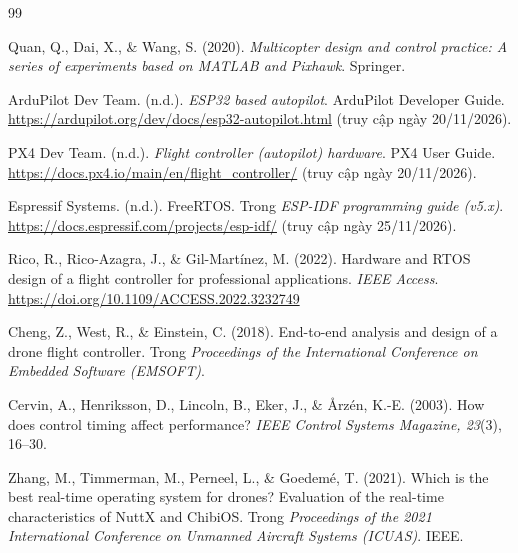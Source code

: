 
\begin{thebibliography}{99}
\footnotesize
\setlength{\itemsep}{0pt}
\setlength{\parskip}{0pt}

Quan, Q., Dai, X., \& Wang, S. (2020). \textit{Multicopter design and control practice: A series of experiments based on MATLAB and Pixhawk}. Springer.

ArduPilot Dev Team. (n.d.). \textit{ESP32 based autopilot}. ArduPilot Developer Guide. \url{https://ardupilot.org/dev/docs/esp32-autopilot.html} (truy cập ngày 20/11/2026).

PX4 Dev Team. (n.d.). \textit{Flight controller (autopilot) hardware}. PX4 User Guide. \url{https://docs.px4.io/main/en/flight_controller/} (truy cập ngày 20/11/2026).

Espressif Systems. (n.d.). FreeRTOS. Trong \textit{ESP-IDF programming guide (v5.x)}. \url{https://docs.espressif.com/projects/esp-idf/} (truy cập ngày 25/11/2026).

Rico, R., Rico-Azagra, J., \& Gil-Martínez, M. (2022). Hardware and RTOS design of a flight controller for professional applications. \textit{IEEE Access}. \url{https://doi.org/10.1109/ACCESS.2022.3232749}

Cheng, Z., West, R., \& Einstein, C. (2018). End-to-end analysis and design of a drone flight controller. Trong \textit{Proceedings of the International Conference on Embedded Software (EMSOFT)}.

Cervin, A., Henriksson, D., Lincoln, B., Eker, J., \& Årzén, K.-E. (2003). How does control timing affect performance? \textit{IEEE Control Systems Magazine, 23}(3), 16--30.

Zhang, M., Timmerman, M., Perneel, L., \& Goedemé, T. (2021). Which is the best real-time operating system for drones? Evaluation of the real-time characteristics of NuttX and ChibiOS. Trong \textit{Proceedings of the 2021 International Conference on Unmanned Aircraft Systems (ICUAS)}. IEEE.


\end{thebibliography}
